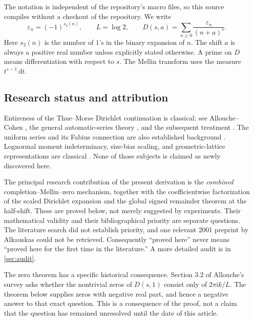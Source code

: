 \documentclass[11pt,a4paper]{article}
\numberwithin{equation}{section}
\theoremstyle{definition}
\theoremstyle{remark}
\newcommand{\eps}{\varepsilon}
\newcommand{\ii}{\mathrm i}
\newcommand{\dd}{\,\mathrm d}
\begin{document}
The notation is independent of the repository's macro files, so this
source compiles without a checkout of the repository. We write
\begin{equation}
 \eps_n=(-1)^{s_2(n)},\qquad L=\log2,
 \qquad D(s,a)=\sum_{n\ge0}\frac{\eps_n}{(n+a)^s}.
 \label{eq:notation}
\end{equation}
Here $s_2(n)$ is the number of $1$'s in the binary expansion of $n$.
The shift $a$ is always a positive real number unless explicitly stated
otherwise. A prime on $D$ means differentiation with respect to $s$.
The Mellin transform uses the measure $t^{s-1}\dd t$.

\subsection{Research status and attribution}
Entireness of the Thue--Morse Dirichlet continuation is classical:
see Allouche--Cohen \cite{AC}, the general automatic-series theory
\cite{AMP}, and the subsequent treatment \cite{Toth}. The uniform
series and its Fabius connection are also established background
\cite{Arias,Haugland,atlas}. Lognormal moment indeterminacy,
size-bias scaling, and geometric-lattice representations are classical
\cite{AGK}. None of those subjects is claimed as newly discovered here.

The principal research contribution of the present derivation is the
\emph{combined} completion--Mellin--zero mechanism, together with the
coefficientwise factorization of the scaled Dirichlet expansion and
the global signed remainder theorem at the half-shift. These are
proved below, not merely suggested by experiments. Their mathematical
validity and their bibliographical priority are separate questions.
The literature search did not establish priority, and one relevant
2001 preprint by Alkauskas \cite{Alkauskas} could not be retrieved.
Consequently ``proved here'' never means ``proved here for the first
time in the literature.'' A more detailed audit is in
\cref{sec:audit}.

The zero theorem has a specific historical consequence. Section 3.2
of Allouche's survey \cite{AlloucheQuestions} asks whether the
nontrivial zeros of $D(s,1)$ consist only of
$2\pi\ii k/L$. The theorem below supplies zeros with negative real
part, and hence a negative answer to that exact question. This is a
consequence of the proof, not a claim that the question has remained
unresolved until the date of this article.
\end{document}
